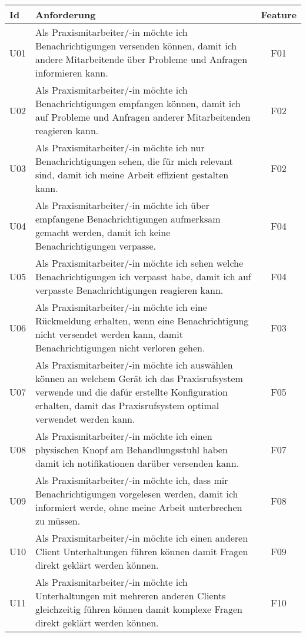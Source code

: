 \begin{table}[h]
    \centering
    \begin{tabular}{|l|p{13cm}|c|}
        \hline
        \textbf{Id} & \textbf{Anforderung}                                                                                                                                                                                         & \textbf{Feature} \\
        \hline
        U01         & Als Praxismitarbeiter/-in möchte ich Benachrichtigungen versenden können, damit ich andere Mitarbeitende über Probleme und Anfragen informieren kann. & F01 \\
        \hline
        U02         & Als Praxismitarbeiter/-in möchte ich Benachrichtigungen empfangen können, damit ich auf Probleme und Anfragen anderer Mitarbeitenden reagieren kann. & F02 \\
        \hline
        U03         & Als Praxismitarbeiter/-in möchte ich nur Benachrichtigungen sehen, die für mich relevant sind, damit ich meine Arbeit effizient gestalten kann. & F02 \\
        \hline
        U04         & Als Praxismitarbeiter/-in möchte ich über empfangene Benachrichtigungen aufmerksam gemacht werden, damit ich keine Benachrichtigungen verpasse. & F04 \\
        \hline
        U05         & Als Praxismitarbeiter/-in möchte ich sehen welche Benachrichtigungen ich verpasst habe, damit ich auf verpasste Benachrichtigungen reagieren kann. & F04 \\
        \hline
        U06         & Als Praxismitarbeiter/-in möchte ich eine Rückmeldung erhalten, wenn eine Benachrichtigung nicht versendet werden kann, damit Benachrichtigungen nicht verloren gehen. & F03 \\
        \hline
        U07         & Als Praxismitarbeiter/-in möchte ich auswählen können an welchem Gerät ich das Praxisrufsystem verwende und die dafür erstellte Konfiguration erhalten, damit das Praxisrufsystem optimal verwendet werden kann. & F05 \\
        \hline
        U08          & Als Praxismitarbeiter/-in möchte ich einen physischen Knopf am Behandlungsstuhl haben damit ich notifikationen darüber versenden kann. & F07 \\
        \hline
        U09          & Als Praxismitarbeiter/-in möchte ich, dass mir Benachrichtigungen vorgelesen werden, damit ich informiert werde, ohne meine Arbeit unterbrechen zu müssen. & F08 \\
        \hline
        U10         & Als Praxismitarbeiter/-in möchte ich einen anderen Client Unterhaltungen führen können damit Fragen direkt geklärt werden können. & F09 \\
        \hline
        U11         & Als Praxismitarbeiter/-in möchte ich Unterhaltungen mit mehreren anderen Clients gleichzeitig führen können damit komplexe Fragen direkt geklärt werden können. & F10 \\
        \hline
    \end{tabular}\label{tab:userstories1}
\end{table}

